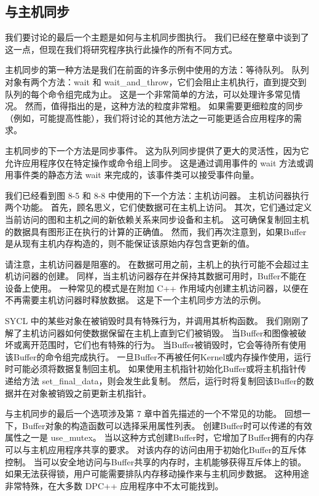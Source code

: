 \subsection{与主机同步}
我们要讨论的最后一个主题是如何与主机同步图执行。 
我们已经在整章中谈到了这一点，但现在我们将研究程序执行此操作的所有不同方式。

主机同步的第一种方法是我们在前面的许多示例中使用的方法：等待队列。 
队列对象有两个方法：wait 和 wait\_and\_throw，它们会阻止主机执行，直到提交到队列的每个命令组完成为止。 
这是一个非常简单的方法，可以处理许多常见情况。 然而，值得指出的是，这种方法的粒度非常粗。 
如果需要更细粒度的同步（例如，可能提高性能），我们将讨论的其他方法之一可能更适合应用程序的需求。

主机同步的下一个方法是同步事件。 这为队列同步提供了更大的灵活性，因为它允许应用程序仅在特定操作或命令组上同步。 
这是通过调用事件的 wait 方法或调用事件类的静态方法 wait 来完成的，该事件类可以接受事件向量。

我们已经看到图 8-5 和 8-8 中使用的下一个方法：主机访问器。 主机访问器执行两个功能。 
首先，顾名思义，它们使数据可在主机上访问。 其次，它们通过定义当前访问的图和主机之间的新依赖关系来同步设备和主机。 
这可确保复制回主机的数据具有图形正在执行的计算的正确值。 
然而，我们再次注意到，如果Buffer是从现有主机内存构造的，则不能保证该原始内存包含更新的值。

请注意，主机访问器是阻塞的。 在数据可用之前，主机上的执行可能不会超过主机访问器的创建。 
同样，当主机访问器存在并保持其数据可用时，Buffer不能在设备上使用。 
一种常见的模式是在附加 C++ 作用域内创建主机访问器，以便在不再需要主机访问器时释放数据。 
这是下一个主机同步方法的示例。

SYCL 中的某些对象在被销毁时具有特殊行为，并调用其析构函数。 
我们刚刚了解了主机访问器如何使数据保留在主机上直到它们被销毁。 
当Buffer和图像被破坏或离开范围时，它们也有特殊的行为。 
当Buffer被销毁时，它会等待所有使用该Buffer的命令组完成执行。 
一旦Buffer不再被任何Kernel或内存操作使用，运行时可能必须将数据复制回主机。 
如果使用主机指针初始化Buffer或将主机指针传递给方法 set\_final\_data，则会发生此复制。 
然后，运行时将复制回该Buffer的数据并在对象被销毁之前更新主机指针。

与主机同步的最后一个选项涉及第 7 章中首先描述的一个不常见的功能。
回想一下，Buffer对象的构造函数可以选择采用属性列表。 
创建Buffer时可以传递的有效属性之一是 use\_mutex。 
当以这种方式创建Buffer时，它增加了Buffer拥有的内存可以与主机应用程序共享的要求。 
对该内存的访问由用于初始化Buffer的互斥体控制。 
当可以安全地访问与Buffer共享的内存时，主机能够获得互斥体上的锁。 
如果无法获得锁，用户可能需要排队内存移动操作来与主机同步数据。 
这种用途非常特殊，在大多数 DPC++ 应用程序中不太可能找到。

